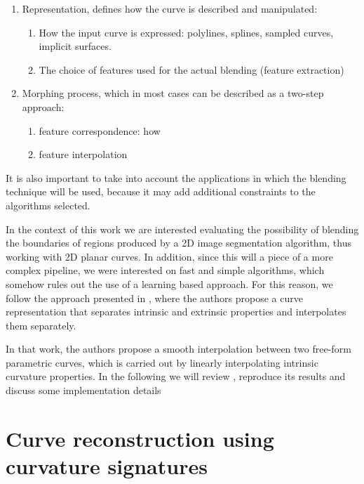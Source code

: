 \documentclass{ipol}
\begin{document}
\begin{enumerate}
    \item Representation, defines how the curve is described and manipulated:
        \begin{enumerate}
            \item How the input curve is expressed: polylines, splines, sampled curves, implicit surfaces.
            \item The choice of features used for the actual blending (feature extraction)
        \end{enumerate}
    \item Morphing process, which in most cases can be described as a two-step approach:
        \begin{enumerate}
            \item feature correspondence: how 
            \item feature interpolation
        \end{enumerate}
\end{enumerate}

It is also important to take into account the applications in which the blending technique will be used, because it may add additional constraints to the algorithms selected.


In the context of this work we are interested evaluating the possibility of blending the boundaries of regions produced by a 2D image segmentation algorithm, thus working with 2D planar curves. In addition, since this will a piece of a more complex pipeline, we were interested on fast and simple algorithms, which somehow rules out the use of a learning based approach.
For this reason, we follow the approach presented in \cite{im_proc:curve_interpolation:elber:07:metamorphosis_planar_parametric_curves}, where the authors propose a curve representation that separates intrinsic and extrinsic properties and interpolates them separately. 

In that work, the authors propose a smooth interpolation between two free-form parametric curves, which is carried out by linearly interpolating intrinsic curvature properties. In the following we will review \cite{im_proc:curve_interpolation:elber:07:metamorphosis_planar_parametric_curves}, reproduce its results and discuss some implementation details

\section{Curve reconstruction using curvature signatures}\label{sec:curve_interpolation:curve_reconstruction}
\end{document}
